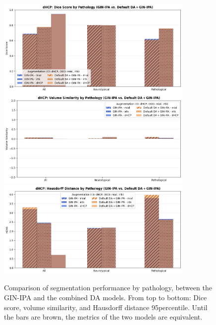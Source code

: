 \begin{figure}[htbp]
  \centering
  \includegraphics[width=0.85\textwidth]{figures/2_pathology_DC.png} \\
  \vspace{10pt}
  \includegraphics[width=0.85\textwidth]{figures/2_pathology_VS.png} \\
  \vspace{10pt}
  \includegraphics[width=0.85\textwidth]{figures/2_pathology_HD.png}
  \caption{Comparison of segmentation performance by pathology, between the GIN-IPA and the combined DA models. From top to bottom: Dice score, volume similarity, and Hausdorff distance 95\th percentile. Until the bars are brown, the metrics of the two models are equivalent.}
  \label{fig:pathology_summary_2}
\end{figure}
